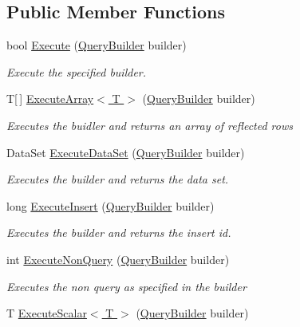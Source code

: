 \subsection*{Public Member Functions}
\begin{DoxyCompactItemize}
\item 
bool \hyperlink{interfaceOTA_1_1Data_1_1IDataConnector_a40f49c9c93757850666f7dc6691f0b5c}{Execute} (\hyperlink{classOTA_1_1Data_1_1QueryBuilder}{Query\+Builder} builder)
\begin{DoxyCompactList}\small\item\em Execute the specified builder. \end{DoxyCompactList}\item 
T\mbox{[}$\,$\mbox{]} \hyperlink{interfaceOTA_1_1Data_1_1IDataConnector_aa59bf992fbdf8ce9516c57f7345afa32}{Execute\+Array$<$ T $>$} (\hyperlink{classOTA_1_1Data_1_1QueryBuilder}{Query\+Builder} builder)
\begin{DoxyCompactList}\small\item\em Executes the buidler and returns an array of reflected rows \end{DoxyCompactList}\item 
Data\+Set \hyperlink{interfaceOTA_1_1Data_1_1IDataConnector_ae8c082203afd91807bb03b3802896b38}{Execute\+Data\+Set} (\hyperlink{classOTA_1_1Data_1_1QueryBuilder}{Query\+Builder} builder)
\begin{DoxyCompactList}\small\item\em Executes the builder and returns the data set. \end{DoxyCompactList}\item 
long \hyperlink{interfaceOTA_1_1Data_1_1IDataConnector_a78c36ece8f633cd2d122480ac571feef}{Execute\+Insert} (\hyperlink{classOTA_1_1Data_1_1QueryBuilder}{Query\+Builder} builder)
\begin{DoxyCompactList}\small\item\em Executes the builder and returns the insert id. \end{DoxyCompactList}\item 
int \hyperlink{interfaceOTA_1_1Data_1_1IDataConnector_ac195342fa4723a84f1fd5da60dd6edcc}{Execute\+Non\+Query} (\hyperlink{classOTA_1_1Data_1_1QueryBuilder}{Query\+Builder} builder)
\begin{DoxyCompactList}\small\item\em Executes the non query as specified in the builder \end{DoxyCompactList}\item 
T \hyperlink{interfaceOTA_1_1Data_1_1IDataConnector_a8f82e10c42565976b2633e9d144e71a3}{Execute\+Scalar$<$ T $>$} (\hyperlink{classOTA_1_1Data_1_1QueryBuilder}{Query\+Builder} builder)

\end{DoxyCompactItemize}
